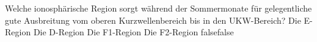     {Welche ionosphärische Region sorgt während der Sommermonate für gelegentliche gute Ausbreitung vom oberen Kurzwellenbereich bis in den UKW-Bereich?}
    {Die E-Region}
    {Die D-Region}
    {Die F1-Region}
    {Die F2-Region}
    {false}{false}